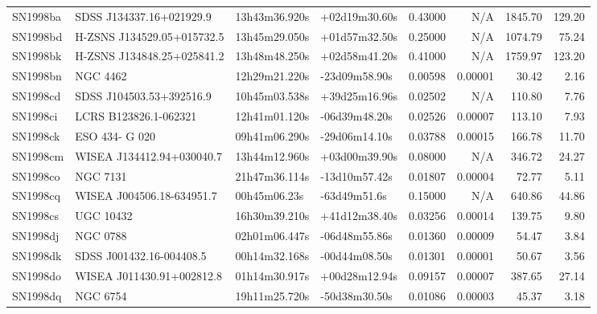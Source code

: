 \begin{longtable}{llllrrrr}
SN1998ba         &        SDSS J134337.16+021929.9 &   13h43m36.920s &   +02d19m30.60s &  0.43000 &      N/A &  1845.70 &      129.20 \\
SN1998bd         &      H-ZSNS J134529.05+015732.5 &   13h45m29.050s &   +01d57m32.50s &  0.25000 &      N/A &  1074.79 &       75.24 \\
SN1998bk         &      H-ZSNS J134848.25+025841.2 &   13h48m48.250s &   +02d58m41.20s &  0.41000 &      N/A &  1759.97 &      123.20 \\
SN1998bn         &                        NGC 4462 &   12h29m21.220s &   -23d09m58.90s &  0.00598 &  0.00001 &    30.42 &        2.16 \\
SN1998cd         &        SDSS J104503.53+392516.9 &   10h45m03.538s &   +39d25m16.96s &  0.02502 &      N/A &   110.80 &        7.76 \\
SN1998ci         &           LCRS B123826.1-062321 &   12h41m01.120s &   -06d39m48.20s &  0.02526 &  0.00007 &   113.10 &        7.93 \\
SN1998ck         &                  ESO 434- G 020 &   09h41m06.290s &   -29d06m14.10s &  0.03788 &  0.00015 &   166.78 &       11.70 \\
SN1998cm         &       WISEA J134412.94+030040.7 &   13h44m12.960s &   +03d00m39.90s &  0.08000 &      N/A &   346.72 &       24.27 \\
SN1998co         &                        NGC 7131 &   21h47m36.114s &   -13d10m57.42s &  0.01807 &  0.00004 &    72.77 &        5.11 \\
SN1998cq         &       WISEA J004506.18-634951.7 &    00h45m06.23s &    -63d49m51.6s &  0.15000 &      N/A &   640.86 &       44.86 \\
SN1998cs         &                       UGC 10432 &   16h30m39.210s &   +41d12m38.40s &  0.03256 &  0.00014 &   139.75 &        9.80 \\
SN1998dj         &                        NGC 0788 &   02h01m06.447s &   -06d48m55.86s &  0.01360 &  0.00009 &    54.47 &        3.84 \\
SN1998dk         &        SDSS J001432.16-004408.5 &   00h14m32.168s &   -00d44m08.50s &  0.01301 &  0.00001 &    50.67 &        3.56 \\
SN1998do         &       WISEA J011430.91+002812.8 &   01h14m30.917s &   +00d28m12.94s &  0.09157 &  0.00007 &   387.65 &       27.14 \\
SN1998dq         &                        NGC 6754 &   19h11m25.720s &   -50d38m30.50s &  0.01086 &  0.00003 &    45.37 &        3.18 \\

\end{longtable}
